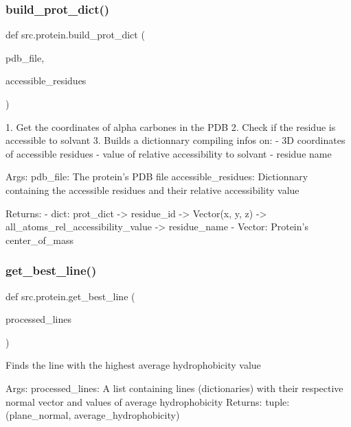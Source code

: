 \subsubsection{\texorpdfstring{build\+\_\+prot\+\_\+dict()}{build\_prot\_dict()}}
{\footnotesize\ttfamily def src.\+protein.\+build\+\_\+prot\+\_\+dict (\begin{DoxyParamCaption}\item[{}]{pdb\+\_\+file,  }\item[{}]{accessible\+\_\+residues }\end{DoxyParamCaption})}

\begin{DoxyVerb}1. Get the coordinates of alpha carbones in the PDB
   2. Check if the residue is accessible to solvant
   3. Builds a dictionnary compiling infos on:
        - 3D coordinates of accessible residues
        - value of relative accessibility to solvant
        - residue name

    Args:
        pdb_file: The protein's PDB file
        accessible_residues: Dictionnary containing the accessible residues and their relative accessibility value

    Returns:
        - dict: prot_dict -> residue_id -> Vector(x, y, z)
                                      -> all_atoms_rel_accessibility_value
                                      -> residue_name
        - Vector: Protein's center_of_mass\end{DoxyVerb}
 \mbox{\label{namespacesrc_1_1protein_a8c066a47c369571e989b856d97bcb735}} 
\subsubsection{\texorpdfstring{get\+\_\+best\+\_\+line()}{get\_best\_line()}}
{\footnotesize\ttfamily def src.\+protein.\+get\+\_\+best\+\_\+line (\begin{DoxyParamCaption}\item[{}]{processed\+\_\+lines }\end{DoxyParamCaption})}

\begin{DoxyVerb}Finds the line with the highest average hydrophobicity value

    Args:
        processed_lines: A list containing lines (dictionaries) with their
                            respective normal vector and values of average
                            hydrophobicity
    Returns:
        tuple: (plane_normal, average_hydrophobicity)
\end{DoxyVerb}
 \mbox{\label{namespacesrc_1_1protein_a189ed925ce20fd17bb6f5ac631acaf89}} 
